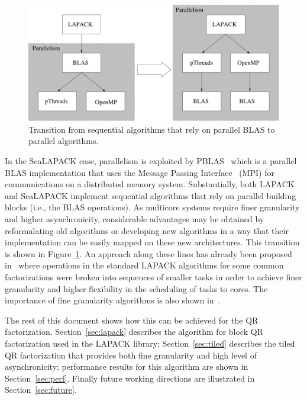 \documentclass[runningheads]{llncs}
\begin{document}
\begin{figure}[!h]
  \begin{center}
    \includegraphics[width=\textwidth]{images/par_algos.pdf}
  \caption{\label{fig:par_algos}Transition from sequential algorithms
    that rely on parallel BLAS to parallel algorithms.}
  \end{center}
\end{figure}

In the ScaLAPACK case, parallelism is exploited by
PBLAS~\cite{666023} which is a parallel BLAS implementation that uses
the Message Passing Interface~\cite{mpif1994} (MPI) for communications
on a distributed memory system.
Substantially, both LAPACK and ScaLAPACK implement sequential
algorithms that rely on parallel building blocks (i.e., the BLAS
operations).
As multicore systems require finer granularity and higher
asynchronicity, considerable advantages may be obtained by
reformulating old
algorithms or developing new algorithms in a way that their implementation can be
easily mapped on these new architectures. This transition is shown in
Figure~\ref{fig:par_algos}. An approach along these lines has already
been proposed in~\cite{Kurzak:2006:ILA,para06,1248397} where operations in
the standard LAPACK algorithms for some common factorizations were broken into sequences of smaller
tasks in order to achieve finer granularity and higher
flexibility in the scheduling of tasks to cores. The importance of
fine granularity algorithms is also shown in~\cite{cell_chol}.

The rest of this document shows how this can be achieved for the QR
factorization.
Section~\ref{sec:lapack} describes the algorithm for block QR factorization used
in the LAPACK
library; Section~\ref{sec:tiled} describes the tiled QR factorization
that provides both fine granularity and high level of asynchronicity;
performance results for this algorithm are shown in
Section~\ref{sec:perf}. Finally future working directions are
illustrated in Section~\ref{sec:future}.
\end{document}
